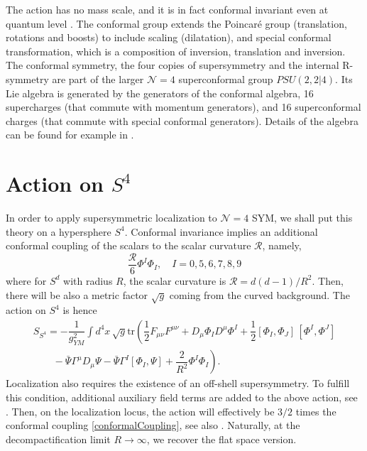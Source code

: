 The action has no mass scale, and it is in fact conformal invariant even at quantum level \cite{MANDELSTAM1983149, BRINK1983323}.
The conformal group extends the Poincar\'e group (translation, rotations and boosts) 
to include scaling (dilatation),
and special conformal transformation, which is a composition of inversion, translation and inversion.
The conformal symmetry, the four copies of supersymmetry and the internal R-symmetry
are part of the larger $\mathcal{N}=4$ superconformal group $PSU(2,2|4)$.
Its Lie algebra is generated by the generators of the conformal algebra, 
16 supercharges (that commute with momentum generators),
and 16 superconformal charges (that commute with special conformal generators). 
Details of the algebra can be found for example in \cite{Minahan:2010js}.


\section{Action on $S^4$}
In order to apply supersymmetric localization to $\mathcal{N}=4$ SYM, 
we shall put this theory on a hypersphere $S^4$.
Conformal invariance implies an additional conformal coupling of the scalars to the scalar curvature $\mathcal{R}$, 
namely,
\begin{equation}\label{conformalCoupling}
 \dfrac{\mathcal{R}}{6} \Phi^I \Phi_I, \quad I=0,5,6,7,8,9
\end{equation}
where for $S^d$ with radius $R$, the scalar curvature is $\mathcal{R} = d(d-1)/R^2 $.
Then, there will be also a metric factor $\sqrt{g}$ coming from the curved background.
The action on $S^4$ is hence
\begin{equation}\label{SS4}
  \begin{split}
    S_{S^4} = - \dfrac{1}{g_{YM}^2} \int d^4 x \, \sqrt{g} \text{tr}
    \left(
        \dfrac{1}{2}F_{\mu \nu}F^{\mu \nu}
       + D_\mu \Phi_I D^\mu \Phi^I
       + \dfrac{1}{2} [\Phi_I, \Phi_J]\, [\Phi^I, \Phi^J]       
    \right. \\
    \left. 
       \qquad
       - \bar{\Psi} \Gamma^\mu D_\mu \Psi 
       - \bar{\Psi} \Gamma^I [ \Phi_I, \Psi ]
       + \dfrac{2}{R^2} \Phi^I \Phi_I
    \right).
   \end{split}
\end{equation}
Localization also requires the existence of an off-shell supersymmetry.
To fulfill this condition, additional auxiliary field terms are added to the above action, see \cite{Pestun:2007rz, Festuccia:2011ws}.
Then, on the localization locus, the action will effectively be $3/2$ times the conformal coupling \eqref{conformalCoupling}, 
see also \cite{Russo:2013qaa}.
Naturally, at the decompactification limit $R \rightarrow \infty$, we recover the flat space version.







